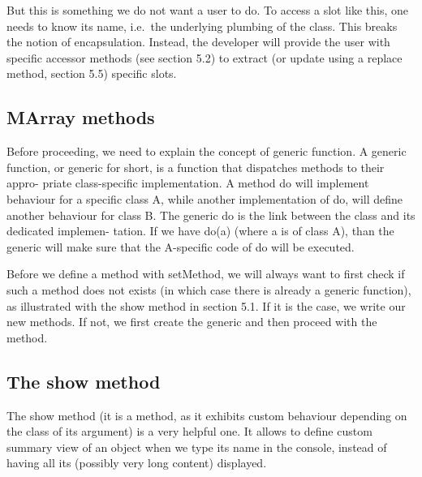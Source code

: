 \documentclass[]{article}
\begin{document}
But this is something we do not want a user to do. To access a slot like
this, one needs to know its name, i.e.~the underlying plumbing of the
class. This breaks the notion of encapsulation. Instead, the developer
will provide the user with speciﬁc accessor methods (see section 5.2) to
extract (or update using a replace method, section 5.5) speciﬁc slots.

\hypertarget{marray-methods}{%
\subsection{MArray methods}\label{marray-methods}}

Before proceeding, we need to explain the concept of generic function. A
generic function, or generic for short, is a function that dispatches
methods to their appro- priate class-speciﬁc implementation. A method do
will implement behaviour for a speciﬁc class A, while another
implementation of do, will deﬁne another behaviour for class B. The
generic do is the link between the class and its dedicated implemen-
tation. If we have do(a) (where a is of class A), than the generic will
make sure that the A-speciﬁc code of do will be executed.

Before we deﬁne a method with setMethod, we will always want to ﬁrst
check if such a method does not exists (in which case there is already a
generic function), as illustrated with the show method in section 5.1.
If it is the case, we write our new methods. If not, we ﬁrst create the
generic and then proceed with the method.

\hypertarget{the-show-method}{%
\subsection{The show method}\label{the-show-method}}

The show method (it is a method, as it exhibits custom behaviour
depending on the class of its argument) is a very helpful one. It allows
to deﬁne custom summary view of an object when we type its name in the
console, instead of having all its (possibly very long content)
displayed.
\end{document}
